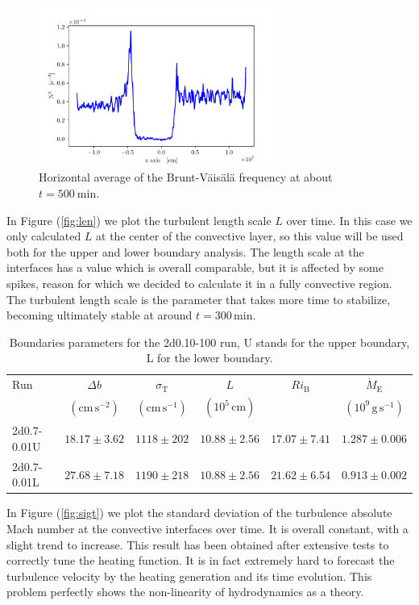 \begin{figure}[t!]
\centering
\includegraphics[width=0.7\textwidth]{./img/brunt}
\caption{Horizontal average of the Brunt-Väisälä frequency at about $t=500 \ \mathrm{min}$.}
\label{fig:brunt}
\end{figure}
In Figure (\ref{fig:len}) we plot the turbulent length scale $L$ over time. In this case we only calculated $L$ at the center of the convective layer, so this value will be used both for the upper and lower boundary analysis. The length scale at the interfaces has a value which is overall comparable, but it is affected by some spikes, reason for which we decided to calculate it in a fully convective region. The turbulent length scale is the parameter that takes more time to stabilize, becoming ultimately stable at around $t = 300 \, \mathrm{min}$. 
 
\begin{table}[b!]\caption{Boundaries parameters for the 2d0.10-100 run, U stands for the upper boundary, L for the lower boundary. }
 \begin{tabular}{lccccc}
	 \toprule
	 Run &$\Delta b  $&$\sigma_{\mathrm{T}}$ & $L$&$Ri_{\mathrm{B}}$&$\dot{M}_{\mathrm{E}}$ \\
		    & $(\mathrm{cm \, s^{-2}})$&$(\mathrm{cm \, s^{-1}})$&$(10^5 \, \mathrm{cm})$ & & $(10^9 \, \mathrm{g \, s^{-1}})$ \\
	  	\midrule
		2d0.7-0.01U&$ 18.17 \pm 3.62 $&$1118 \pm 202 $ &  $10.88 \pm 2.56 $ & $17.07 \pm 7.41 $ & $1.287 \pm 0.006$\\
		2d0.7-0.01L &$27.68 \pm 7.18$&$1190 \pm 218$ & $10.88 \pm 2.56$ &  $21.62 \pm 6.54$ & $0.913 \pm 0.002$\\
		\bottomrule
	\end{tabular}\label{2dsingletab}
 \end{table}
In Figure (\ref{fig:sigt}) we plot the standard deviation of the turbulence absolute Mach number at the convective interfaces over time. It is overall constant, with a slight trend to increase. This result has been obtained after extensive tests to correctly tune the heating function. It is in fact extremely hard to forecast the turbulence velocity by the heating generation and its time evolution. This problem perfectly shows the non-linearity of hydrodynamics as a theory.

